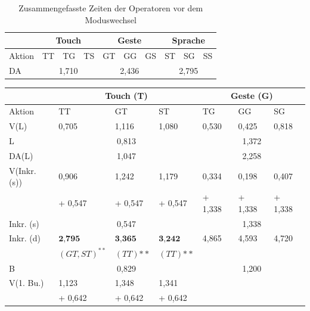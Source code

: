 \begin{table}[ht]
  \centering
	\begin{tabular}{|l|l|l|l|l|l|l|l|l|l|}
		\hline
		& \multicolumn{3}{|c|}{Touch} & \multicolumn{3}{|c|}{Geste}&\multicolumn{3}{|c|}{Sprache}\\
		\hline
		Aktion 					& TT 		& TG 		& TS 		& GT 		& GG 		& GS 		& ST 		& SG 		& SS\\
		\hline
		DA 	& \multicolumn{3}{|c|}{1,710} &	\multicolumn{3}{|c|}{2,436} 	&	\multicolumn{3}{|c|}{2,795} \\
		\hline
  \end{tabular}
	\caption{Zusammengefasste Zeiten der Operatoren vor dem Moduswechsel}
\label{tab:OperatorzeitenZusammengefasst1}
\end{table}
\begin{table}[ht]
  \centering
	\begin{tabular}{|l|l|l|l|l|l|l|}
		\hline
		& \multicolumn{3}{|c|}{Touch (T)} & \multicolumn{3}{|c|}{Geste (G)}\\
		\hline
		Aktion 					& TT 	& GT 	& ST 	& TG 	& GG 	& SG \\
		\hline
		V(L)	& {0,705} 	& {1,116}		& {1,080} 	&	{0,530}		&	{0,425}		&	{0,818}\\
		\hline
		L					& \multicolumn{3}{|c|}{0,813} &	\multicolumn{3}{|c|}{1,372}\\
		\hline
		DA(L)			& \multicolumn{3}{|c|}{1,047} &	\multicolumn{3}{|c|}{2,258}\\
		\hline
		V(Inkr. (s))
										& {0,906} 	& {1,242}		& {1,179} 	&	{0,334}		&	{0,198}		&	{0,407}\\
										& \small{+ 0,547} 	& \small{+ 0,547}	& \tiny{+ 0,547} 	&	\small{+ 1,338}	&	\tiny{+ 1,338}	&	\small{+ 1,338}\\
		\hline
		Inkr. (s)				& \multicolumn{3}{|c|}{0,547} &	\multicolumn{3}{|c|}{1,338}\\
		\hline
		Inkr. (d)				& $\textbf{2,795}$ & $\textbf{3,365}$	& $\textbf{3,242}$ &	4,865	&	4,593	&	4,720	\\
									& \small{$(GT,ST)^{**}$} & \small{$(TT){**}$}	& \small{$(TT){**}$}  &	&	&		 \\
		\hline
		B 				& \multicolumn{3}{|c|}{0,829} &	\multicolumn{3}{|c|}{1,200}\\
		\hline
		V(1. Bu.)
										& {1,123} 	& {1,348}		& {1,341} 	&				& 			&  	\\
										& \small{+ 0,642} & \small{+ 0,642}	& \small{+ 0,642} &				& 			&  		\\
		\hline

\end{tabular}
\end{table}
